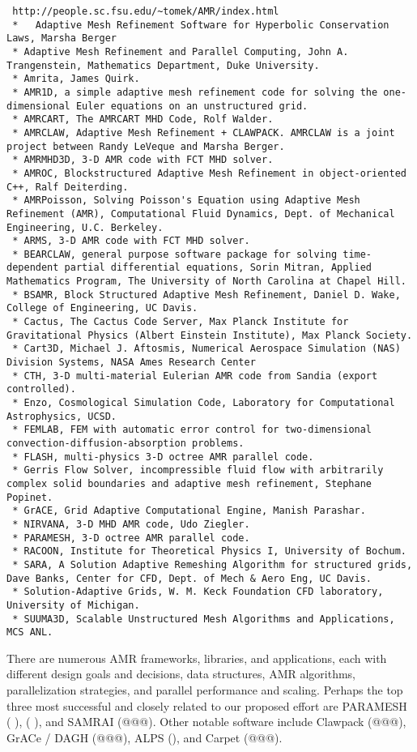 \documentclass[14pt,letter]{article}
\begin{document}
\begin{verbatim}
 http://people.sc.fsu.edu/~tomek/AMR/index.html
 *   Adaptive Mesh Refinement Software for Hyperbolic Conservation Laws, Marsha Berger
 * Adaptive Mesh Refinement and Parallel Computing, John A. Trangenstein, Mathematics Department, Duke University.
 * Amrita, James Quirk.
 * AMR1D, a simple adaptive mesh refinement code for solving the one-dimensional Euler equations on an unstructured grid.
 * AMRCART, The AMRCART MHD Code, Rolf Walder.
 * AMRCLAW, Adaptive Mesh Refinement + CLAWPACK. AMRCLAW is a joint project between Randy LeVeque and Marsha Berger.
 * AMRMHD3D, 3-D AMR code with FCT MHD solver.
 * AMROC, Blockstructured Adaptive Mesh Refinement in object-oriented C++, Ralf Deiterding.
 * AMRPoisson, Solving Poisson's Equation using Adaptive Mesh Refinement (AMR), Computational Fluid Dynamics, Dept. of Mechanical Engineering, U.C. Berkeley.
 * ARMS, 3-D AMR code with FCT MHD solver.
 * BEARCLAW, general purpose software package for solving time-dependent partial differential equations, Sorin Mitran, Applied Mathematics Program, The University of North Carolina at Chapel Hill.
 * BSAMR, Block Structured Adaptive Mesh Refinement, Daniel D. Wake, College of Engineering, UC Davis.
 * Cactus, The Cactus Code Server, Max Planck Institute for Gravitational Physics (Albert Einstein Institute), Max Planck Society.
 * Cart3D, Michael J. Aftosmis, Numerical Aerospace Simulation (NAS) Division Systems, NASA Ames Research Center
 * CTH, 3-D multi-material Eulerian AMR code from Sandia (export controlled).
 * Enzo, Cosmological Simulation Code, Laboratory for Computational Astrophysics, UCSD.
 * FEMLAB, FEM with automatic error control for two-dimensional convection-diffusion-absorption problems.
 * FLASH, multi-physics 3-D octree AMR parallel code.
 * Gerris Flow Solver, incompressible fluid flow with arbitrarily complex solid boundaries and adaptive mesh refinement, Stephane Popinet.
 * GrACE, Grid Adaptive Computational Engine, Manish Parashar.
 * NIRVANA, 3-D MHD AMR code, Udo Ziegler.
 * PARAMESH, 3-D octree AMR parallel code.
 * RACOON, Institute for Theoretical Physics I, University of Bochum.
 * SARA, A Solution Adaptive Remeshing Algorithm for structured grids, Dave Banks, Center for CFD, Dept. of Mech & Aero Eng, UC Davis.
 * Solution-Adaptive Grids, W. M. Keck Foundation CFD laboratory, University of Michigan.
 * SUUMA3D, Scalable Unstructured Mesh Algorithms and Applications, MCS ANL. 
\end{verbatim}

There are numerous AMR frameworks, libraries, and applications, each
with different design goals and decisions, data structures, AMR
algorithms, parallelization strategies, and parallel performance and
scaling.  Perhaps the top three most successful and closely related to
our proposed effort are PARAMESH (\cite{MaOl00} \nocite{OlMa05}
\nocite{Ol06}),  (\cite{wwwchombo} \cite{CoGr09}), and SAMRAI
(@@@).  Other notable software include Clawpack (@@@), GrACe / DAGH
(@@@), ALPS (\cite{BuBu09}), and Carpet (@@@).
\end{document}

